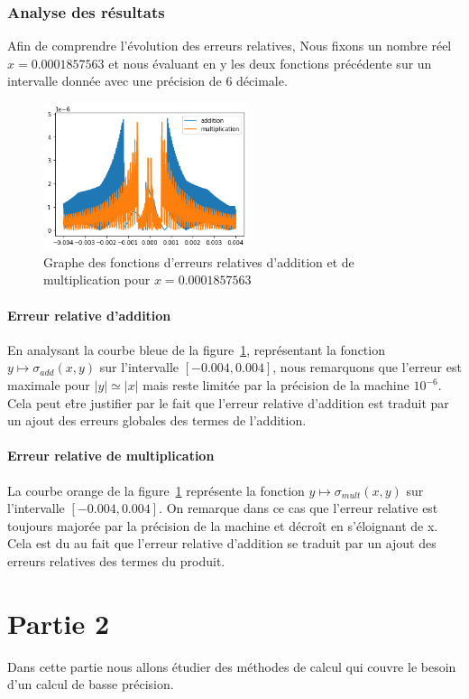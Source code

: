 \documentclass{article}
\begin{document}
\subsubsection{Analyse des résultats}
Afin de comprendre l'évolution des erreurs relatives, Nous fixons un nombre réel $x=0.0001857563$ et nous évaluant en y les deux fonctions précédente sur un intervalle donnée avec une précision de 6 décimale.
\begin{figure}[!ht]
    \centering
    \includegraphics[width=60mm,scale=1.5]{res/graphe_fcts_erreur.png}
    \caption{Graphe des fonctions d'erreurs relatives d'addition et de multiplication pour $x=0.0001857563$ }
    \label{fig:graphe_erreur}
\end{figure}
\paragraph{Erreur relative d'addition\\}
En analysant la courbe bleue de la figure~\ref{fig:graphe_erreur}, représentant la fonction  $y \mapsto   \sigma_{add} (x,y) $ sur l'intervalle $[-0.004,0.004]$, nous remarquons que l'erreur est maximale pour $ |y| \simeq |x|$ mais reste limitée par la précision de la machine $10^{-6}$. Cela peut e\^tre justifier par le fait que l'erreur relative d'addition est traduit par un ajout des erreurs globales des termes de l'addition.


\paragraph{Erreur relative de multiplication\\}
La courbe orange de la figure~\ref{fig:graphe_erreur} représente la fonction $y \mapsto \sigma_{mult} (x,y) $ sur l'intervalle $[-0.004,0.004]$. On remarque dans ce cas que l'erreur relative est toujours majorée par la précision de la machine et décroît en s'éloignant de x. Cela est du au fait que l'erreur relative d'addition se traduit par un ajout des erreurs relatives des termes du produit. 

\section{Partie 2}
Dans cette partie nous allons étudier des méthodes de calcul qui couvre le besoin d'un calcul de basse précision.
\end{document}
